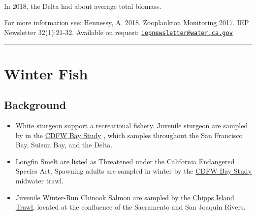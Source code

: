 \documentclass[
]{book}
\providecommand{\tightlist}{%
  \setlength{\itemsep}{0pt}\setlength{\parskip}{0pt}}
\begin{document}
\begin{panel-grid}
\begin{columns-nocenter}
\begin{column40}

~

\end{column40}

\begin{column800}

In 2018, the Delta had about average total biomass.

\end{column800}

\end{columns-nocenter}

\end{panel-grid}

\begin{disclaimer}
For more information see: Hennessy, A. 2018. Zooplankton Monitoring
2017. IEP Newsletter 32(1):21-32. Available on request:
\href{mailto:iepnewsletter@water.ca.gov}{\nolinkurl{iepnewsletter@water.ca.gov}}
\end{disclaimer}

\begin{center}\rule{0.5\linewidth}{0.5pt}\end{center}

\hypertarget{winter-fish}{%
\section{Winter Fish}\label{winter-fish}}

\hypertarget{background-4}{%
\subsection{Background}\label{background-4}}

\begin{itemize}
\tightlist
\item
  White sturgeon support a recreational fishery. Juvenile sturgeon are sampled by in the \href{https://wildlife.ca.gov/Conservation/Delta/Bay-Study}{CDFW Bay Study} , which samples throughout the San Francisco Bay, Suisun Bay, and the Delta.
\item
  Longfin Smelt are listed as Threatened under the California Endangered Species Act. Spawning adults are sampled in winter by the \href{https://wildlife.ca.gov/Conservation/Delta/Bay-Study}{CDFW Bay Study} midwater trawl.
\item
  Juvenile Winter-Run Chinook Salmon are sampled by the \href{https://www.fws.gov/lodi/juvenile_fish_monitoring_program/jfmp_index.htm}{Chipps Island Trawl}, located at the confluence of the Sacramento and San Joaquin Rivers.
\end{itemize}
\end{document}
